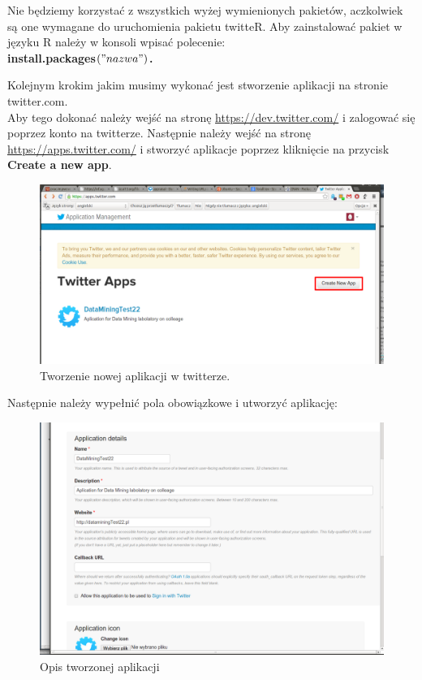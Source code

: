 \documentclass[12pt,a4paper]{report}
\begin{document}
Nie będziemy korzystać z wszystkich wyżej wymienionych pakietów, aczkolwiek są one wymagane do uruchomienia pakietu twitteR. 
Aby zainstalować pakiet w języku R należy w konsoli wpisać polecenie: \\ \textbf{install.packages$\left("nazwa"\right)$.}

Kolejnym krokim jakim musimy wykonać jest stworzenie aplikacji na stronie twitter.com. \\
Aby tego dokonać należy wejść na stronę \url{https://dev.twitter.com/} i zalogować się poprzez konto na twitterze. Następnie należy wejść na stronę \url{https://apps.twitter.com/} i stworzyć  aplikacje poprzez kliknięcie na przycisk \textbf{Create a new app}.

\begin{figure}[H]
\begin{center}
\includegraphics[scale=0.2]{pictures/Twitter1.png}
\caption{Tworzenie nowej aplikacji w twitterze.}
\end{center}
\end{figure}
Następnie należy wypełnić pola obowiązkowe i utworzyć aplikację: 
\begin{figure}[H]
\begin{center}
\includegraphics[scale=0.2]{pictures/Twitter2.png}
\caption{Opis tworzonej aplikacji}
\end{center}
\end{figure}
\end{document}
